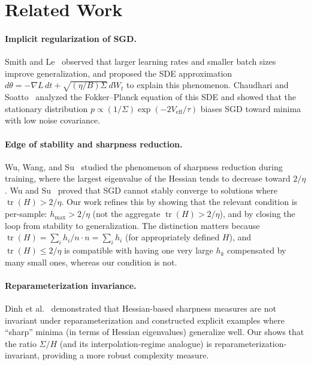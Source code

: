 \documentclass[11pt,a4paper]{article}
\theoremstyle{definition}
\theoremstyle{remark}
\DeclareMathOperator{\tr}{tr}
\begin{document}
\section{Related Work}\label{sec:related}

\paragraph{Implicit regularization of SGD.}
Smith and Le~\cite{SmithLe2018} observed that larger learning rates and smaller batch
sizes improve generalization, and proposed the SDE approximation
$d\theta = -\nabla L\,dt + \sqrt{(\eta/B)\Sigma}\,dW_t$ to explain this
phenomenon.  Chaudhari and Soatto~\cite{ChaudhariSoatto2018} analyzed the
Fokker--Planck equation of this SDE and showed that the stationary distribution
$p \propto (1/\Sigma)\exp(-2V_{\mathrm{eff}}/\tau)$ biases SGD toward minima with low
noise covariance.

\paragraph{Edge of stability and sharpness reduction.}
Wu, Wang, and Su~\cite{WuWangSu2022} studied the phenomenon of sharpness reduction
during training, where the largest eigenvalue of the Hessian tends to decrease toward
$2/\eta$.  Wu and Su~\cite{WuSu2023} proved that SGD cannot stably converge to
solutions where $\tr(H) > 2/\eta$.  Our work refines this by showing that the relevant
condition is per-sample: $h_{\max} > 2/\eta$ (not the aggregate $\tr(H) > 2/\eta$),
and by closing the loop from stability to generalization.  The distinction matters
because $\tr(H) = \sum_i h_i / n \cdot n = \sum_i h_i$ (for appropriately defined
$H$), and $\tr(H) \leq 2/\eta$ is compatible with having one very large $h_k$
compensated by many small ones, whereas our condition is not.

\paragraph{Reparameterization invariance.}
Dinh et al.~\cite{Dinh2017} demonstrated that Hessian-based sharpness measures are
not invariant under reparameterization and constructed explicit examples where
``sharp'' minima (in terms of Hessian eigenvalues) generalize well.  Our
 shows that the ratio $\Sigma/H$ (and its interpolation-regime
analogue) is reparameterization-invariant, providing a more robust complexity measure.
\end{document}
